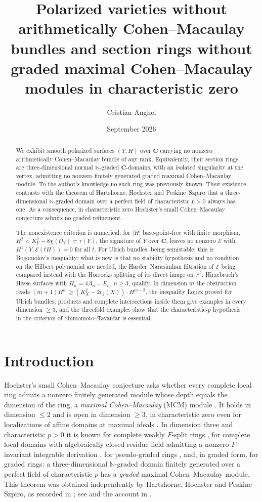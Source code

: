 \documentclass[11pt]{amsart}
\title[Varieties without aCM bundles, rings without graded MCM modules]{Polarized varieties without arithmetically Cohen--Macaulay bundles and section rings without graded maximal Cohen--Macaulay modules in characteristic zero}
\author{Cristian Anghel}
\date{September 2026}
\theoremstyle{remark}
\theoremstyle{definition}
\newcommand{\PP}{\mathbb{P}}
\newcommand{\NN}{\mathbb{N}}
\newcommand{\CC}{\mathbf{C}}
\newcommand{\cO}{\mathcal{O}}
\newcommand{\cE}{\mathcal{E}}
\begin{document}
\begin{abstract}
We exhibit smooth polarized surfaces $(Y,H)$ over $\CC$ carrying no nonzero arithmetically Cohen--Macaulay bundle of any rank. Equivalently, their section rings are three-dimensional normal $\NN$-graded $\CC$-domains, with an isolated singularity at the vertex, admitting no nonzero finitely generated graded maximal Cohen--Macaulay module. To the author's knowledge no such ring was previously known. Their existence contrasts with the theorem of Hartshorne, Hochster and Peskine--Szpiro that a three-dimensional $\NN$-graded domain over a perfect field of characteristic $p>0$ always has one. As a consequence, in characteristic zero Hochster's small Cohen--Macaulay conjecture admits no graded refinement.

The nonexistence criterion is numerical: for $|H|$ base-point-free with finite morphism, $H^2<K_Y^2-8\chi(\cO_Y)=\tau(Y)$, the signature of $Y$ over $\CC$, leaves no nonzero $\cE$ with $H^1(Y,\cE(tH))=0$ for all $t$. For Ulrich bundles, being semistable, this is Bogomolov's inequality; what is new is that no stability hypothesis and no condition on the Hilbert polynomial are needed, the Harder--Narasimhan filtration of $\cE$ being compared instead with the Horrocks splitting of its direct image on $\PP^2$. Hirzebruch's Hesse surfaces with $H_n=4A_n-E_n$, $n\ge3$, qualify. In dimension $m$ the obstruction reads $(m+1)H^m\ge(K_X^2-2c_2(X))\cdot H^{m-2}$, the inequality Lopez proved for Ulrich bundles; products and complete intersections inside them give examples in every dimension $\ge3$, and the threefold examples show that the characteristic-$p$ hypothesis in the criterion of Shimomoto--Tavanfar is essential.
\end{abstract}

\maketitle

\section*{Introduction}

Hochster's small Cohen--Macaulay conjecture asks whether every complete local ring admits a nonzero finitely generated module whose depth equals the dimension of the ring, a \emph{maximal Cohen--Macaulay} (MCM) module \cite{Ho75,Ho04}. It holds in dimension $\le2$ and is open in dimension $\ge3$, in characteristic zero even for localizations of affine domains at maximal ideals \cite{ShTa}. In dimension three and characteristic $p>0$ it is known for complete weakly $F$-split rings \cite{Sch17}, for complete local domains with algebraically closed residue field admitting a nonzero $F$-invariant integrable derivation \cite[Thm.~3.4]{Sch20}, for pseudo-graded rings \cite{Sch20}, and, in graded form, for graded rings: a three-dimensional $\NN$-graded domain finitely generated over a perfect field of characteristic $p$ has a \emph{graded} maximal Cohen--Macaulay module. This theorem was obtained independently by Hartshorne, Hochster and Peskine--Szpiro, as recorded in \cite[Thm.~1 and Cor.~2]{Ho04}; see \cite{Ho75,PS} and the account in \cite{ShTa}.
\end{document}
